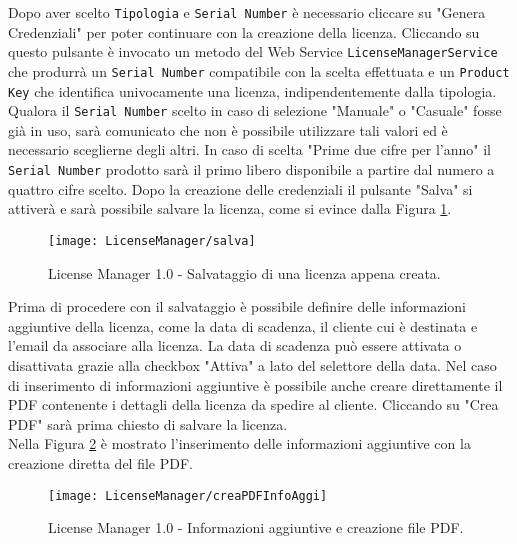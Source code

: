 Dopo aver scelto \texttt{Tipologia} e \texttt{Serial Number} è necessario cliccare su "Genera Credenziali" per poter continuare con la creazione della licenza. Cliccando su questo pulsante è invocato un metodo del Web Service \texttt{LicenseManagerService} che produrrà un \texttt{Serial Number} compatibile con la scelta effettuata e un \texttt{Product Key} che identifica univocamente una licenza, indipendentemente dalla tipologia. Qualora il \texttt{Serial Number} scelto in caso di selezione "Manuale" o "Casuale" fosse già in uso, sarà comunicato che non è possibile utilizzare tali valori ed è necessario sceglierne degli altri. In caso di scelta "Prime due cifre per l’anno" il \texttt{Serial Number} prodotto sarà il primo libero disponibile a partire dal numero a quattro cifre scelto. Dopo la creazione delle credenziali il pulsante "Salva" si attiverà e sarà possibile salvare la licenza, come si evince dalla Figura \ref{salva}.

 \begin{figure}[!h] 
    \centering 
    \texttt{[image: LicenseManager/salva]} 
    \caption{License Manager 1.0 - Salvataggio di una licenza appena creata.}
\label{salva}
\end{figure}

Prima di procedere con il salvataggio è possibile definire delle informazioni aggiuntive della licenza, come la data di scadenza, il cliente cui è destinata e l’email da associare alla licenza. La data di scadenza può essere attivata o disattivata grazie alla checkbox "Attiva" a lato del selettore della data. Nel caso di inserimento di informazioni aggiuntive è possibile anche creare direttamente il PDF contenente i dettagli della licenza da spedire al cliente. Cliccando su "Crea PDF" sarà prima chiesto di salvare la licenza.
\\Nella Figura \ref{pdf} è mostrato l'inserimento delle informazioni aggiuntive con la creazione diretta del file PDF.


\begin{figure}[!h] 
    \centering 
    \texttt{[image: LicenseManager/creaPDFInfoAggi]} 
    \caption{License Manager 1.0 - Informazioni aggiuntive e creazione file PDF.}
\label{pdf}
\end{figure}

